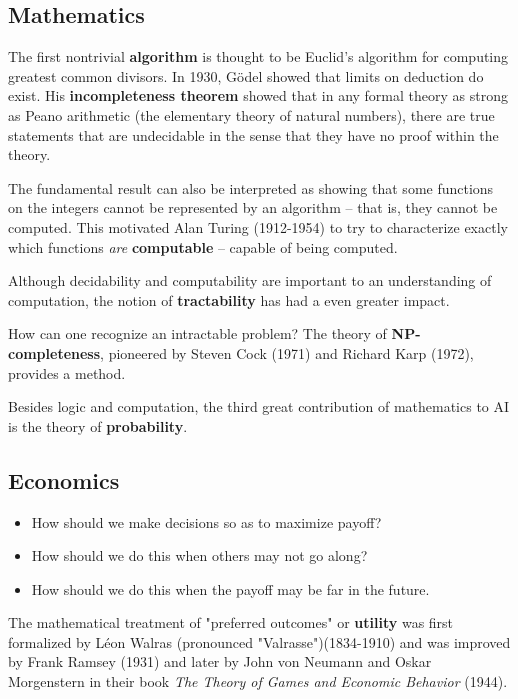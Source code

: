 \documentclass[a4paper,10pt,twoside]{book}
\begin{document}
\subsection{Mathematics}

The first nontrivial \textbf{algorithm} is thought to be Euclid's algorithm for computing greatest common divisors. In 1930, G\"odel showed that limits on deduction do exist. His \textbf{incompleteness theorem} showed that in any formal theory as strong as Peano arithmetic (the elementary theory of natural numbers), there are true statements that are undecidable in the sense that they have no proof within the theory.

The fundamental result can also be interpreted as showing that some functions on the integers cannot be represented by an algorithm -- that is, they cannot be computed. This motivated Alan Turing (1912-1954) to try to characterize exactly which functions \textit{are} \textbf{computable} -- capable of being computed.

Although decidability and computability are important to an understanding of computation, the notion of \textbf{tractability} has had a even greater impact.

How can one recognize an intractable problem? The theory of \textbf{NP-completeness}, pioneered by Steven Cock (1971) and Richard Karp (1972), provides a method.

Besides logic and computation, the third great contribution of mathematics to AI is the theory of \textbf{probability}.

\subsection{Economics}

\begin{itemize}
    \item How should we make decisions so as to maximize payoff?
    \item How should we do this when others may not go along?
    \item How should we do this when the payoff may be far in the future.
\end{itemize}

The mathematical treatment of "preferred outcomes" or \textbf{utility} was first formalized by L\'eon Walras (pronounced "Valrasse")(1834-1910) and was improved by Frank Ramsey (1931) and later by John von Neumann and Oskar Morgenstern in their book \textit{The Theory of Games and Economic Behavior} (1944).
\end{document}
